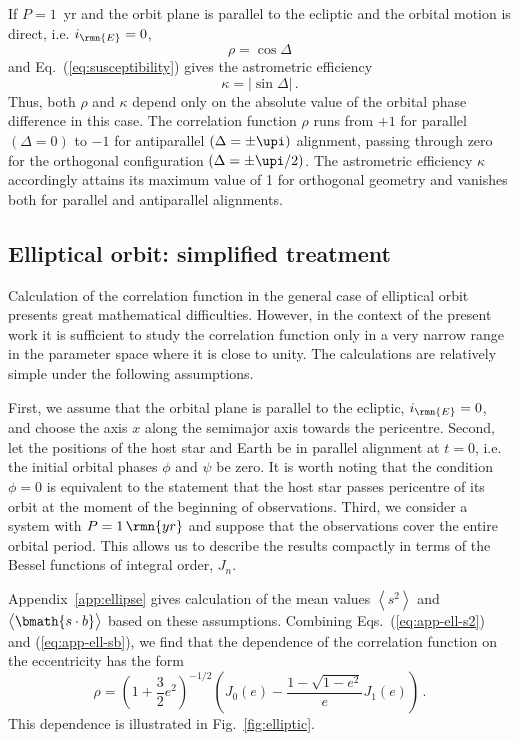 \documentclass[fleqn,usenatbib,useAMS,usedcolumn]{mnras}
\begin{document}
If $P=1$~yr and the orbit plane is parallel to the ecliptic and the orbital motion is direct, i.e. $i_\rmn{E}=0$,
\begin{equation}
  \rho = \cos\Delta
\end{equation}
and Eq.~(\ref{eq:susceptibility}) gives the astrometric efficiency
\begin{equation}
  \kappa = \left|\sin\Delta\right|\,.
\end{equation}
Thus, both $\rho$ and $\kappa$ depend only on the absolute value of the orbital phase difference in this case. The correlation function $\rho$ runs from $+1$ for parallel $\left(\Delta=0\right)$ to $-1$ for antiparallel $\left(\Delta=\pm\upi\right)$ alignment, passing through zero for the orthogonal configuration $\left(\Delta=\pm\upi/2\right)$. The astrometric efficiency $\kappa$ accordingly attains its maximum value of 1 for orthogonal geometry and vanishes both for parallel and antiparallel alignments.

\subsection{Elliptical orbit: simplified treatment}
\label{ss:ellipse}

Calculation of the correlation function in the general case of elliptical orbit presents great mathematical difficulties. However, in the context of the present work it is sufficient to study the correlation function only in a very narrow range in the parameter space where it is close to unity. The calculations are relatively simple under the following assumptions.

First, we assume that the orbital plane is parallel to the ecliptic, $i_\rmn{E}=0$, and choose the axis $x$ along the semimajor axis towards the pericentre. Second, let the positions of the host star and Earth be in parallel alignment at $t=0$, i.e. the initial orbital phases $\phi$ and $\psi$ be zero. It is worth noting that the condition $\phi=0$ is equivalent to the statement that the host star passes pericentre of its orbit at the moment of the beginning of observations. Third, we consider a system with $P=1\,\rmn{yr}$ and suppose that the observations cover the entire orbital period. This allows us to describe the results compactly in terms of the Bessel functions of integral order, $J_n$.

Appendix~\ref{app:ellipse} gives calculation of the mean values $\left\langle s^2\right\rangle$ and $\left\langle\bmath{s\cdot b}\vphantom{s^2}\right\rangle$ based on these assumptions.
Combining Eqs.~(\ref{eq:app-ell-s2}) and (\ref{eq:app-ell-sb}), we find that the dependence of the correlation function on the eccentricity has the form
\begin{equation}\label{eq:ell-corr}
  \rho=\left(1+\frac{3}{2}e^2\right)^{-1/2}\left(J_0\left(e\right)-\frac{1-\sqrt{1-e^2}}{e}J_1\left(e\right)\right)\,.
\end{equation}
This dependence is illustrated in Fig.~\ref{fig:elliptic}.
\end{document}
